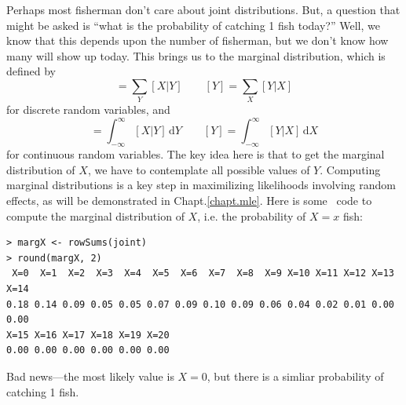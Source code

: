 Perhaps most fisherman don't care about joint distributions. But, a
question that might be asked is ``what is the probability
of catching 1 fish today?'' Well, we know that this depends upon the
number of fisherman, but we don't know how many will show up
today. This brings us to the marginal distribution, which is defined by
\begin{equation*}
  [X] = \sum_Y [X|Y] \qquad
  [Y] = \sum_X [Y|X]
\end{equation*}
for discrete random variables, and
\begin{equation*}
  [X] = \int_{-\infty}^\infty [X|Y] \, \mathrm{d}Y \qquad
  [Y] = \int_{-\infty}^\infty [Y|X] \, \mathrm{d}X
\end{equation*}
for continuous random variables. The key idea here is that to get the
marginal distribution of $X$, we have to contemplate all possible
values of $Y$. Computing marginal distributions is a key step in
maximilizing likelihoods involving random effects, as will be
demonstrated in Chapt.\ref{chapt.mle}. Here is some \R~code to compute
the marginal distribution of $X$, i.e. the probability of $X=x$ fish:
\begin{verbatim}
> margX <- rowSums(joint)
> round(margX, 2)
 X=0  X=1  X=2  X=3  X=4  X=5  X=6  X=7  X=8  X=9 X=10 X=11 X=12 X=13 X=14
0.18 0.14 0.09 0.05 0.05 0.07 0.09 0.10 0.09 0.06 0.04 0.02 0.01 0.00 0.00
X=15 X=16 X=17 X=18 X=19 X=20
0.00 0.00 0.00 0.00 0.00 0.00
\end{verbatim}
Bad news---the most likely value is $X=0$, but there is a simliar
probability of catching 1 fish.

